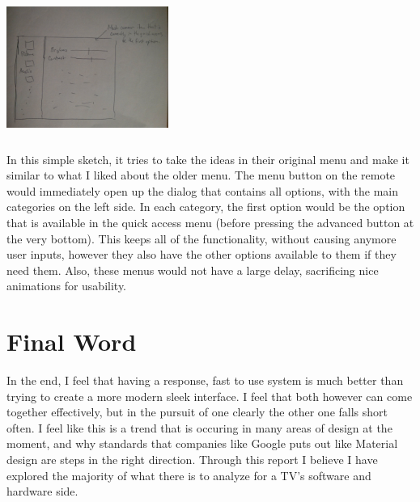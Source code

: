 \documentclass[a4paper, 11pt]{article}
\begin{document}
\includegraphics[width=200px,height=200px]{sketch.jpg} \\

In this simple sketch, it tries to take the ideas in their original menu and make it similar to what I liked about the older menu.  The menu button on the remote would immediately open up the dialog that contains all options, with the main categories on the left side.  In each category, the first option would be the option that is available in the quick access menu (before pressing the advanced button at the very bottom).  This keeps all of the functionality, without causing anymore user inputs, however they also have the other options available to them if they need them.  Also, these menus would not have a large delay, sacrificing nice animations for usability.

\section*{Final Word}
In the end, I feel that having a response, fast to use system is much better than trying to create a more modern sleek interface.  I feel that both however can come together effectively, but in the pursuit of one clearly the other one falls short often.  I feel like this is a trend that is occuring in many areas of design at the moment, and why standards that companies like Google puts out like Material design are steps in the right direction.  Through this report I believe I have explored the majority of what there is to analyze for a TV's software and hardware side.
\end{document}

